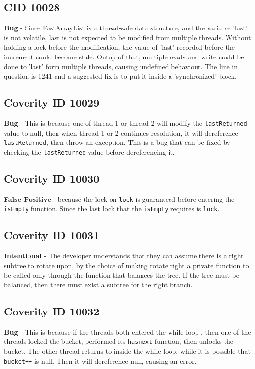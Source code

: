 \documentclass[12pt]{article}
\begin{document}
\subsection{CID 10028}
\textbf{Bug} - Since FastArrayList is a thread-safe data structure, and the variable 'last' is not volatile, last is not expected to be modified from multiple threads. Without holding a lock before the modification, the value of 'last' recorded before the increment could become stale. Ontop of that, multiple reads and write could be done to 'last' form multiple threads, causing undefined behaviour. The line in question is 1241 and a suggested fix is to put it inside a 'synchronized' block.
\subsection*{Coverity ID 10029}
\textbf{Bug} - This is because one of thread 1 or thread 2 will modify the \texttt{lastReturned} value to null, then when thread 1 or 2 continues resolution, it will dereference \texttt{lastReturned}, then throw an exception. This is a bug that can be fixed by checking the \texttt{lastReturned} value before dereferencing it.
\subsection*{Coverity ID 10030}
\textbf{False Positive} - because the lock on \texttt{lock} is guaranteed before entering the \texttt{isEmpty} function. Since the last lock that the \texttt{isEmpty} requires is \texttt{lock}.
\subsection*{Coverity ID 10031}
\textbf{Intentional} - The developer understands that they can assume there is a right subtree to rotate upon, by the choice of making rotate right a private function to be called only through the function that balances the tree. If the tree must be balanced, then there must exist a subtree for the right branch.
\subsection*{Coverity ID 10032}
\textbf{Bug} - This is because if the threads both entered the while loop , then one of the threads locked the bucket, performed its \texttt{hasnext} function, then unlocks the bucket. The other thread returns to inside the while loop, while it is possible that \texttt{bucket++} is null. Then it will dereference null, causing an error.
\end{document}

